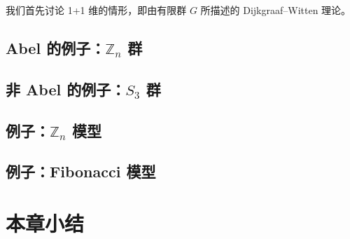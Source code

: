 我们首先讨论 1+1 维的情形，即由有限群 $G$ 所描述的 Dijkgraaf--Witten 理论。

\subsection{Abel 的例子：\texorpdfstring{$\mathbb{Z}_n$}{ℤₙ} 群}

\subsection{非 Abel 的例子：\texorpdfstring{$S_3$}{𝑆₃} 群}

\subsection{例子：\texorpdfstring{$\mathbb{Z}_n$}{ℤₙ} 模型}

\subsection{例子：Fibonacci 模型}

\section{本章小结}
